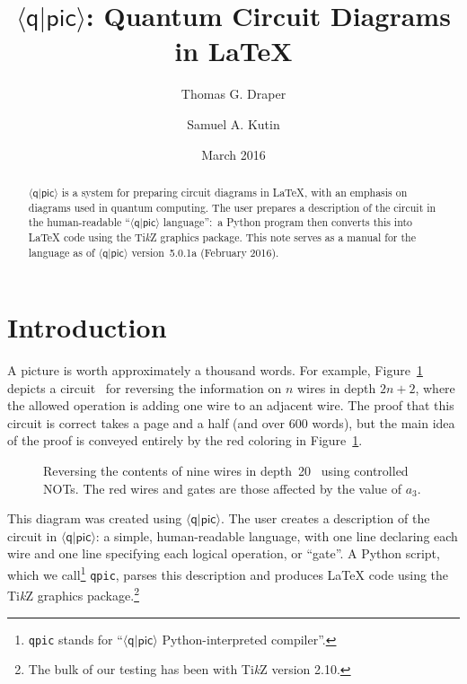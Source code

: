 \documentclass[twoside,12pt]{article}
\title{$\langle\mathsf{q}|\mathsf{pic}\rangle$: Quantum Circuit Diagrams in \LaTeX}
\author{Thomas G. Draper \and Samuel A. Kutin}
\date{March 2016}
\newcommand{\qpic}{$\langle\mathsf{q}|\mathsf{pic}\rangle$\xspace}
\newcommand{\qpicpy}{{\tt qpic}\xspace}
\newcommand{\TikZ}{Ti\emph{k}Z\xspace}
\begin{document}
\maketitle
\begin{abstract} 
{$\langle\mathsf{q}|\mathsf{pic}\rangle$\xspace} is a system
for preparing circuit diagrams in \LaTeX, with an emphasis on diagrams
used in quantum computing.  The user prepares a description of the
circuit in the human-readable
``{$\langle\mathsf{q}|\mathsf{pic}\rangle$\xspace} language'':\ a
Python program then converts this into {\LaTeX} code using the
{Ti\emph{k}Z\xspace} graphics package.  This note serves as a manual
for the language as of
{$\langle\mathsf{q}|\mathsf{pic}\rangle$\xspace} version~5.0.1a
(February 2016).
\end{abstract}

\tableofcontents
\newpage

\section{Introduction}

A picture is worth approximately a thousand words.  For example, Figure~\ref{fig-rev} depicts a
circuit~\cite{kutin-moulton-smithline} for reversing the information on $n$ wires in depth $2n+2$,
where the allowed operation is adding one wire to an adjacent wire.  The proof that this circuit
is correct takes a page and a half (and over 600 words), but the main idea of the proof is conveyed
entirely by the red coloring in Figure~\ref{fig-rev}.

\begin{figure}[h!]
\begin{center}

\end{center}
\caption{Reversing the contents of nine wires in depth~20~\cite{kutin-moulton-smithline} using controlled NOTs.  The red wires and gates are those affected by the value of $a_3$.}
\label{fig-rev}
\end{figure}


This diagram was created using \qpic.  The user creates a description of the
circuit in \qpic: a simple, human-readable language, with one line declaring each wire and one line specifying each
logical operation, or ``gate''.  A Python script, which we
call\footnote{\qpicpy stands for ``\qpic Python-interpreted compiler''.}
\qpicpy, parses this description
and produces {\LaTeX} code using the \TikZ graphics package.\footnote{The bulk of our testing has been with \TikZ version 2.10.}
\end{document}
